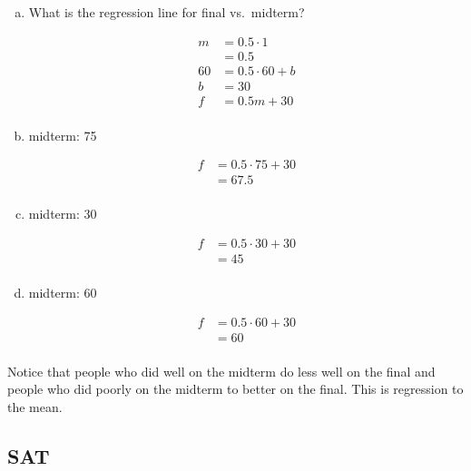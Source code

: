 \documentclass[letterpaper, landscape]{exam}
\begin{document}
  \begin{enumerate}[(a)]
    \item What is the regression line for final vs.\ midterm?
      \begin{solution}
        \begin{align*}
          m  & = 0.5 \cdot 1 \\
             & = 0.5 \\
          60 & = 0.5 \cdot 60 + b \\
          b  & = 30 \\
          f  & = 0.5m + 30 \\
        \end{align*}
      \end{solution}

    \item midterm: 75
      \begin{solution}
        \begin{align*}
          f & = 0.5 \cdot 75 + 30 \\
            & = 67.5 \\
        \end{align*}
      \end{solution}

    \item midterm: 30
      \begin{solution}
        \begin{align*}
          f & = 0.5 \cdot 30 + 30 \\
            & = 45 \\
        \end{align*}
      \end{solution}
      
    \item midterm: 60
      \begin{solution}
        \begin{align*}
          f & = 0.5 \cdot 60 + 30 \\
            & = 60 \\
        \end{align*}
      \end{solution}
  \end{enumerate}

  Notice that people who did well on the midterm do less well on the final and people who did
  poorly on the midterm to better on the final. This is regression to the mean.

  \subsection{SAT} %
  
\end{document}
